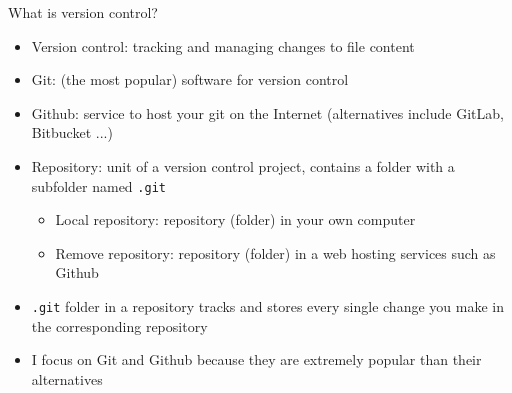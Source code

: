 \documentclass[handout,pdftex,10pt,aspectratio=169]{beamer}
\begin{document}
\begin{frame}{What is version control?}
  \begin{itemize}
    \item Version control: tracking and managing changes to file content
    \item Git: (the most popular) software for version control
    \item Github: service to host your git on the Internet
    (alternatives include GitLab, Bitbucket ...)
    \item Repository: unit of a version control project, 
    contains a folder with a subfolder named \texttt{.git}
    \begin{itemize}
      \item Local repository: repository (folder) in your own computer
      \item Remove repository: repository (folder) in a web hosting services such as Github
    \end{itemize}
    \item \texttt{.git} folder in a repository tracks and stores every single change you make in the corresponding repository
    \medskip
    \item I focus on Git and Github  because they are extremely popular
    than their alternatives
  \end{itemize}
\end{frame}
\end{document}
